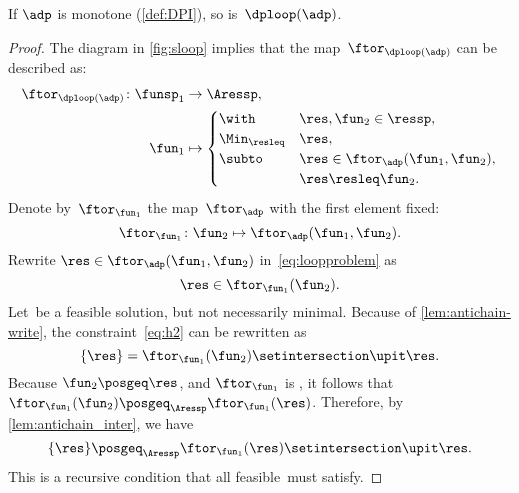 \begin{proposition}
	\label{prop:loop-continuous}
	If $\adp$ is monotone (\cref{def:DPI}),
	so is~$\dploop(\adp)$.
\end{proposition}
\begin{proof}
	The diagram in \cref{fig:sloop} implies that the map~$\ftor_{\dploop(\adp)}$
	can be described as:
	\begin{align}
		\ftor_{\dploop(\adp)}\colon\funsp_{1} & \to\Aressp,\label{eq:loopproblem} \\
		\fun_{1}                              & \mapsto\begin{cases}
			\with          & \res,\fun_{2}\in\ressp,                 \\
			\Min_{\resleq} & \res,                                   \\
			\subto         & \res\in\ftor_{\adp}(\fun_{1},\fun_{2}), \\
			               & \res\resleq\fun_{2}.
		\end{cases}
	\end{align}
	Denote by~$\ftor_{\fun_{1}}$ the map~$\ftor_{\adp}$ with the first element fixed:
	\begin{equation*}
		\ftor_{\fun_{1}}\colon\fun_{2}\mapsto\ftor_{\adp}(\fun_{1},\fun_{2}).
	\end{equation*}
	Rewrite $\res\in\ftor_{\adp}(\fun_{1},\fun_{2})$ in~\cref{eq:loopproblem} as
	\begin{equation}
		\res\in\ftor_{\fun_{1}}(\fun_{2}).
		\label{eq:h2}
	\end{equation}
	Let~\res be a feasible solution, but not necessarily minimal.
	Because of \cref{lem:antichain-write}, the constraint~\cref{eq:h2} can be rewritten as
	\begin{equation}
		\{\res\}=\ftor_{\fun_{1}}(\fun_{2})\setintersection\upit\res.
		\label{eq:h3}
	\end{equation}
	Because $\fun_{2}\posgeq\res$, and $\ftor_{\fun_{1}}$ is \scottcontinuous, it follows that~$\ftor_{\fun_{1}}(\fun_{2})\posgeq_{\Aressp}\ftor_{\fun_{1}}(\res)$.
	Therefore, by \cref{lem:antichain_inter}, we have
	\begin{equation}
		\{\res\}\posgeq_{\Aressp}\ftor_{\fun_{1}}(\res)\setintersection\upit\res.
		\label{eq:fea}
	\end{equation}
	This is a recursive condition that all feasible~\res must satisfy.


\end{proof}
